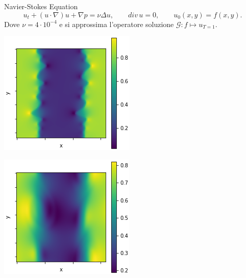 \documentclass[aspectratio=169]{beamer}
\begin{document}
\begin{frame}[t]{Navier-Stokes Equation}
    \[
        u_{t} + (u \cdot \nabla) u + \nabla p = \nu \Delta u, \qquad div \, u = 0, \quad \quad u_{0}(x, y) = f(x, y).
    \]
    Dove $\nu = 4 \cdot 10^{-4}$ e si approssima l'operatore soluzione $\mathcal{G}: f\mapsto u_{T=1}$.
    \begin{center}
        \begin{minipage}{0.24\textwidth}
            \includegraphics[width=\textwidth]{operators/shearLayer/input.png}
        \end{minipage}
        \hfill
        \begin{minipage}{0.24\textwidth}
            \includegraphics[width=\textwidth]{operators/shearLayer/output.png}

\end{minipage}
\end{center}
\end{frame}
\end{document}

